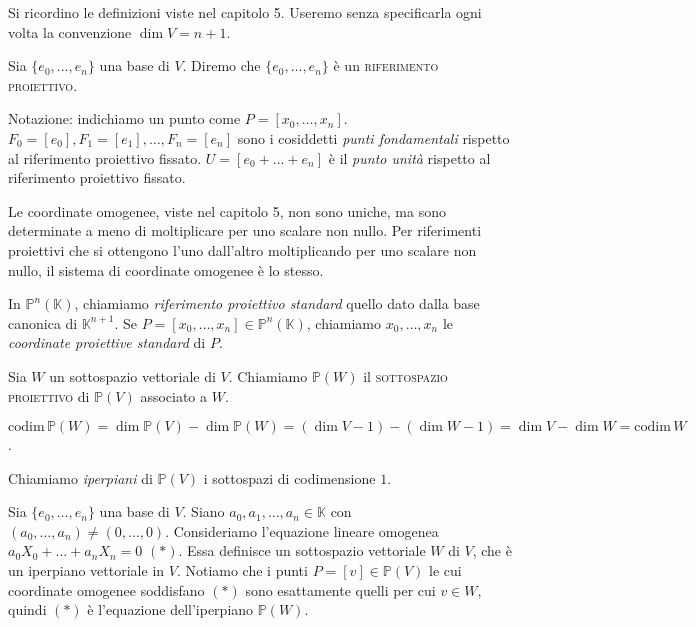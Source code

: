 Si ricordino le definizioni viste nel capitolo 5. Useremo senza specificarla ogni volta la convenzione $\dim{V}=n+1$.

\begin{defn}
  Sia $\{e_0, \dots, e_n\}$ una base di $V$. Diremo che $\{e_0, \dots, e_n\}$ è un \textsc{riferimento proiettivo}.
\end{defn}

Notazione: indichiamo un punto come $P=[x_0,\dots,x_n]$. $F_0=[e_0], F_1=[e_1], \dots, F_n=[e_n]$ sono i cosiddetti \textit{punti fondamentali} rispetto al riferimento proiettivo fissato. $U=[e_0+\dots+e_n]$ è il \textit{punto unità} rispetto al riferimento proiettivo fissato.

\begin{oss}
  Le coordinate omogenee, viste nel capitolo 5, non sono uniche, ma sono determinate a meno di moltiplicare per uno scalare non nullo. Per riferimenti proiettivi che si ottengono l'uno dall'altro moltiplicando per uno scalare non nullo, il sistema di coordinate omogenee è lo stesso.
\end{oss}

In $\mathbb{P}^n(\mathbb{K})$, chiamiamo \textit{riferimento proiettivo standard} quello dato dalla base canonica di $\mathbb{K}^{n+1}$. Se $P=[x_0, \dots, x_n] \in \mathbb{P}^n(\mathbb{K})$, chiamiamo $x_0, \dots, x_n$ le \textit{coordinate proiettive standard} di $P$.

\begin{defn}
  Sia $W$ un sottospazio vettoriale di $V$. Chiamiamo $\mathbb{P}(W)$ il \textsc{sottospazio proiettivo} di $\mathbb{P}(V)$ associato a $W$.
\end{defn}

\begin{oss}
  $\text{codim}\,\mathbb{P}(W)=\dim{\mathbb{P}(V)}-\dim{\mathbb{P}(W)}=(\dim{V}-1)-(\dim{W}-1)=\dim{V}-\dim{W}=\text{codim}\,W$.
\end{oss}

\begin{defn}
  Chiamiamo \textit{iperpiani} di $\mathbb{P}(V)$ i sottospazi di codimensione $1$.
\end{defn}

\begin{oss} \label{stessa_equazione}
  Sia $\{e_0, \dots, e_n\}$ una base di $V$. Siano $a_0, a_1, \dots, a_n \in \mathbb{K}$ con $(a_0, \dots, a_n) \not= (0, \dots, 0)$. Consideriamo l'equazione lineare omogenea $a_0X_0+\dots+a_nX_n=0$ $(*)$. Essa definisce un sottospazio vettoriale $W$ di $V$, che è un iperpiano vettoriale in $V$.
  Notiamo che i punti $P=[v] \in \mathbb{P}(V)$ le cui coordinate omogenee soddisfano $(*)$ sono esattamente quelli per cui $v \in W$, quindi $(*)$ è l'equazione dell'iperpiano $\mathbb{P}(W)$.
\end{oss}

